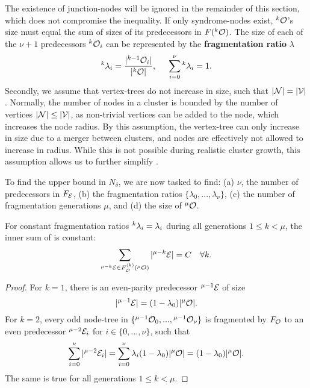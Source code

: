 The existence of junction-nodes will be ignored in the remainder of this section, which does not compromise the inequality. If only syndrome-nodes exist, ${}^{k}\mathcal{O}$'s size must equal the sum of sizes of its predecessors in $F({}^{k}\mathcal{O})$. The size of each of the $\nu+1$ predecessors ${}^{k}\mathcal{O}_i$ can be represented by the \textbf{fragmentation ratio} $\lambda$
\begin{equation}\label{eq:ratio}
  {}^{k}\lambda_i = \frac{\lvert{}^{k-1}\mathcal{O}_i\rvert}{\lvert{}^{k}\mathcal{O}\rvert}, \hspace{0.5cm} \sum_{i=0}^{\nu}{{}^{k}\lambda_i} = 1.
\end{equation}
Secondly, we assume that vertex-trees do not increase in size, such that $\lvert\mathcal{N}\rvert=\lvert\mathcal{V}\rvert$. Normally, the number of nodes in a cluster is bounded by the number of vertices $\lvert\mathcal{N}\rvert\leq \lvert\mathcal{V}\rvert$, as non-trivial vertices can be added to the node, which increases the node radius. By this assumption, the vertex-tree can only increase in size due to a merger between clusters, and nodes are effectively not allowed to increase in radius. While this is not possible during realistic cluster growth, this assumption allows us to further simplify . 

To find the upper bound in $N_\delta$, we are now tasked to find: (a) $\nu$, the number of predecessors in $F_{\mathcal{E}}$, (b) the fragmentation ratios $\{\lambda_0, ..., \lambda_\nu\}$, (c) the number of fragmentation generations $\mu$, and (d) the size of ${}^{\mu}\mathcal{O}$. 

\begin{lemma}\label{lem:evenconstant}
  For constant fragmentation ratios ${}^{k}\lambda_i = \lambda_i$ during all generations $1\leq k<\mu$, the inner sum of  is constant:
  \begin{equation*}
    \sum_{ {}^{\mu-k}\mathcal{E} \in F_{\mathcal{O}}^{(k)}({}^{\mu}\mathcal{O}) }{ \lvert{}^{\mu-k}\mathcal{E}\rvert} = C \hspace{1em}\forall k.
  \end{equation*}
\end{lemma}
\begin{proof}
  For $k=1$, there is an even-parity predecessor ${}^{\mu-1}\mathcal{E}$ of size 
  \begin{equation*}
    \lvert{}^{\mu-1}\mathcal{E}\rvert = (1 - \lambda_0)\lvert{}^{\mu}\mathcal{O}\rvert.
  \end{equation*}
  For $k=2$, every odd node-tree in $\{{}^{\mu-1}\mathcal{O}_0,... ,{}^{\mu-1}\mathcal{O}_\nu\}$ is fragmented by $F_{\mathcal{O}}$ to an even predecessor ${}^{\mu-2}\mathcal{E}_i$ for $i \in \{0,...,\nu \}$, such that 
  \begin{equation*}
    \sum_{i=0}^{\nu}{\lvert{}^{\mu-2}\mathcal{E}_i\rvert}  = \sum_{i=0}^{\nu}{\lambda_i(1 - \lambda_0)\lvert{}^{\mu}\mathcal{O}\rvert}= (1 - \lambda_0)\lvert{}^{\mu}\mathcal{O}\rvert.
  \end{equation*}
  The same is true for all generations $1\leq k<\mu$. 
\end{proof}


